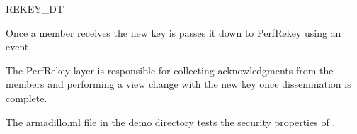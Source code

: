 \begin{Layer}{REKEY\_DT}
\begin{Protocol}
Once a member receives the new key is passes it down to PerfRekey
using an  event.

The PerfRekey layer is responsible for collecting acknowledgments from the
members and performing a view change with the new key once
dissemination is complete. 
\end{Protocol}

\begin{Sources}
\end{Sources}

\begin{GenEvent}
\genevent{\DnCast}
\genevent{\DnSend}
\end{GenEvent}

\begin{Testing}
\item 
The armadillo.ml file in the demo directory tests the security properties
of \ensemble.
\end{Testing}

\end{Layer}


